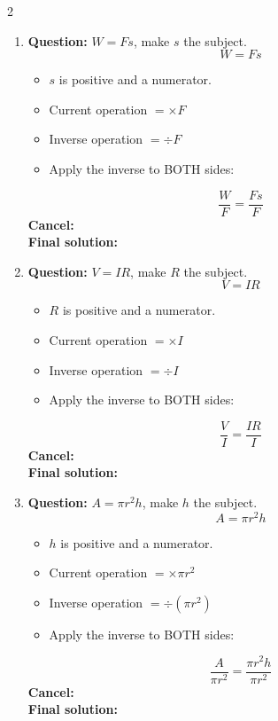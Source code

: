 \documentclass[11pt]{article}
\begin{document}
\begin{multicols}{2}
\begin{enumerate}[leftmargin=*, itemsep=10pt]
\item \textbf{Question:} \( W = Fs \), make \( s \) the subject.
\[
W=Fs
\]
\begin{itemize}[leftmargin=*, itemsep=2pt]
\item \(s\) is positive and a numerator.
\item Current operation \(= \times F\)
\item Inverse operation \(= \div F\)
\item Apply the inverse to BOTH sides:
\end{itemize}
\[
\frac{W}{F}=\frac{Fs}{F}
\]
\textbf{Cancel:} \\[1.5cm]
\textbf{Final solution:}\\[1.5cm]

\columnbreak
\item \textbf{Question:} \( V = IR \), make \( R \) the subject.
\[
V=IR
\]
\begin{itemize}[leftmargin=*, itemsep=2pt]
\item \(R\) is positive and a numerator.
\item Current operation \(= \times I\)
\item Inverse operation \(= \div I\)
\item Apply the inverse to BOTH sides:
\end{itemize}
\[
\frac{V}{I}=\frac{IR}{I}
\]
\textbf{Cancel:} \\[1.5cm]
\textbf{Final solution:}\\[1.5cm]

\item \textbf{Question:} \( A = \pi r^{2}h \), make \( h \) the subject.
\[
A=\pi r^{2}h
\]
\begin{itemize}[leftmargin=*, itemsep=2pt]
\item \(h\) is positive and a numerator.
\item Current operation \(= \times \pi r^{2}\)
\item Inverse operation \(= \div (\pi r^{2})\)
\item Apply the inverse to BOTH sides:
\end{itemize}
\[
\frac{A}{\pi r^{2}}=\frac{\pi r^{2}h}{\pi r^{2}}
\]
\textbf{Cancel:} \\[1.5cm]
\textbf{Final solution:}\\[1.5cm]


\end{enumerate}
\end{multicols}
\end{document}
